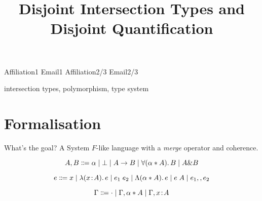 \documentclass[nocopyrightspace,preprint,times,9pt]{sigplanconf}
\begin{document}


\preprintfooter{\name}                        %

\title{Disjoint Intersection Types and Disjoint Quantification}

           {Affiliation1}
           {Email1}
           {Affiliation2/3}
           {Email2/3}

\maketitle


\keywords intersection types, polymorphism, type system

\section{Formalisation}

What's the goal? A System $F$-like language with a \emph{merge} operator and coherence.


\begin{equation}
  A, B \Coloneqq \alpha \mid \bot \mid A \to B \mid \forall (\alpha * A).\, B \mid A \& B
\end{equation}

\begin{equation}
  e \Coloneqq x \mid \lambda (x \!:\! A).\, e \mid e_1 \; e_2 \mid \Lambda (\alpha * A).\, e \mid e \; A \mid e_1 ,, e_2
\end{equation}

\begin{equation}
  \Gamma \Coloneqq \cdot
                   \mid \Gamma, \alpha * A
                   \mid \Gamma, x \!:\! A
\end{equation}



\end{document}
